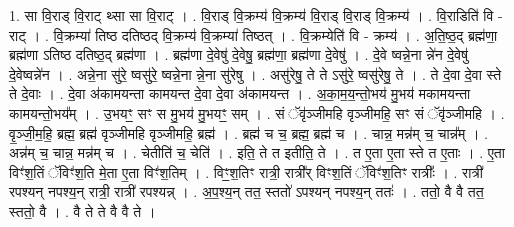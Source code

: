 \documentclass[17pt]{extarticle}
\begin{document}
1. सा वि॒राड् वि॒राट् थ्सा सा वि॒राट् । . वि॒राड् वि॒क्रम्य॑ वि॒क्रम्य॑ वि॒राड् वि॒राड् वि॒क्रम्य॑ । . वि॒राडिति॑ वि - राट् । . वि॒क्रम्या॑ तिष्ठ दतिष्ठद् वि॒क्रम्य॑ वि॒क्रम्या॑ तिष्ठत् । . वि॒क्रम्येति॑ वि - क्रम्य॑ । . अ॒ति॒ष्ठ॒द् ब्रह्म॑णा॒ ब्रह्म॑णा ऽतिष्ठ दतिष्ठ॒द् ब्रह्म॑णा । . ब्रह्म॑णा दे॒वेषु॑ दे॒वेषु॒ ब्रह्म॑णा॒ ब्रह्म॑णा दे॒वेषु॑ । . दे॒वे ष्वन्ने॒ना न्ने॑न दे॒वेषु॑ दे॒वेष्वन्ने॑न । . अन्ने॒ना सु॑रे॒ ष्वसु॑रे॒ ष्वन्ने॒ना न्ने॒ना सु॑रेषु । . असु॑रेषु॒ ते ते ऽसु॑रे॒ ष्वसु॑रेषु॒ ते । . ते दे॒वा दे॒वा स्ते ते दे॒वाः । . दे॒वा अ॑कामयन्ता कामयन्त दे॒वा दे॒वा अ॑कामयन्त । . अ॒का॒म॒य॒न्तो॒भय॑ मु॒भय॑ मकामयन्ता कामयन्तो॒भय᳚म् । . उ॒भयꣳ॒॒ सꣳ स मु॒भय॑ मु॒भयꣳ॒॒ सम् । . सं ॅवृ॑ञ्जीमहि वृञ्जीमहि॒ सꣳ सं ॅवृ॑ञ्जीमहि । . वृ॒ञ्जी॒म॒हि॒ ब्रह्म॒ ब्रह्म॑ वृञ्जीमहि वृञ्जीमहि॒ ब्रह्म॑ । . ब्रह्म॑ च च॒ ब्रह्म॒ ब्रह्म॑ च । . चान्न॒ मन्न॑म् च॒ चान्न᳚म् । . अन्न॑म् च॒ चान्न॒ मन्न॑म् च । . चेतीति॑ च॒ चेति॑ । . इति॒ ते त इतीति॒ ते । . त ए॒ता ए॒ता स्ते त ए॒ताः । . ए॒ता विꣳ॑श॒तिं ॅविꣳ॑श॒ति मे॒ता ए॒ता विꣳ॑श॒तिम् । . विꣳ॒॒श॒तिꣳ रात्री॒ रात्री᳚र् विꣳश॒तिं ॅविꣳ॑श॒तिꣳ रात्रीः᳚ । . रात्री॑ रपश्यन् नपश्य॒न् रात्री॒ रात्री॑ रपश्यन्न् । . अ॒प॒श्य॒न् तत॒ स्ततो॑ ऽपश्यन् नपश्य॒न् ततः॑ । . ततो॒ वै वै तत॒ स्ततो॒ वै । . वै ते ते वै वै ते । \newline
\end{document}
